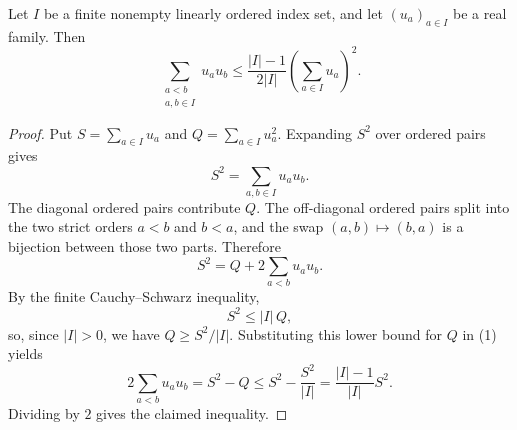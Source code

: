 \begin{helper}
Let $I$ be a finite nonempty linearly ordered index set, and let
$(u_a)_{a\in I}$ be a real family.  Then
\[
\sum_{\substack{a<b\\a,b\in I}}u_a u_b
\le
\frac{|I|-1}{2|I|}\left(\sum_{a\in I}u_a\right)^2.
\]
\end{helper}
\begin{proof}
Put $S=\sum_{a\in I}u_a$ and $Q=\sum_{a\in I}u_a^2$.  Expanding $S^2$
over ordered pairs gives
\[
S^2=\sum_{a,b\in I}u_a u_b.
\]
The diagonal ordered pairs contribute $Q$.  The off-diagonal ordered pairs
split into the two strict orders $a<b$ and $b<a$, and the swap
$(a,b)\mapsto (b,a)$ is a bijection between those two parts.  Therefore
\[
S^2=Q+2\sum_{a<b}u_a u_b. \tag{1}
\]
By the finite Cauchy--Schwarz inequality,
\[
S^2\le |I|\,Q,
\]
so, since $|I|>0$, we have $Q\ge S^2/|I|$.  Substituting this lower bound
for $Q$ in (1) yields
\[
2\sum_{a<b}u_a u_b
=S^2-Q
\le S^2-\frac{S^2}{|I|}
=\frac{|I|-1}{|I|}S^2.
\]
Dividing by $2$ gives the claimed inequality.
\end{proof}
